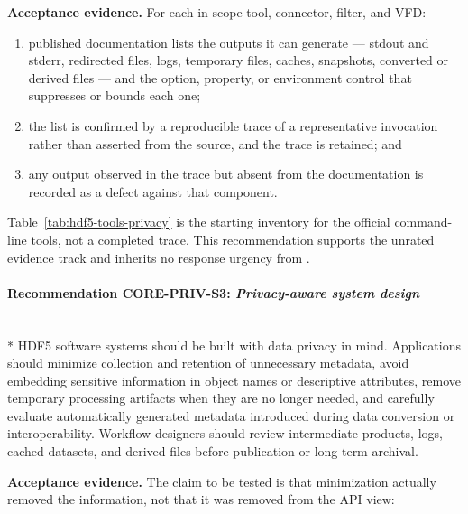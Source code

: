 \documentclass[../main.tex]{subfiles}
\begin{document}
\noindent\textbf{Acceptance evidence.}
For each in-scope tool, connector, filter, and VFD:

\begin{enumerate}[label=(\alph*),leftmargin=2em]
    \item published documentation lists the outputs it can generate --- stdout
          and stderr, redirected files, logs, temporary files, caches,
          snapshots, converted or derived files --- and the option, property,
          or environment control that suppresses or bounds each one;
    \item the list is confirmed by a reproducible trace of a representative
          invocation rather than asserted from the source, and the trace is
          retained; and
    \item any output observed in the trace but absent from the documentation
          is recorded as a defect against that component.
\end{enumerate}

Table~\ref{tab:hdf5-tools-privacy} is the starting inventory for the official
command-line tools, not a completed trace. This recommendation supports the
unrated  evidence track and inherits no response urgency
from .

\paragraph{Recommendation CORE-PRIV-S3: \emph{Privacy-aware system design}}\mbox{}\\*
HDF5 software systems should be built with data privacy in mind. Applications should 
minimize collection and retention of unnecessary metadata, avoid embedding sensitive 
information in object names or descriptive attributes, remove temporary processing
artifacts when they are no longer needed, and carefully evaluate automatically
generated metadata introduced during data conversion or interoperability.
Workflow designers should review intermediate products, logs, cached datasets, and
derived files before publication or long-term archival.

\noindent\textbf{Acceptance evidence.}
The claim to be tested is that minimization actually removed the information,
not that it was removed from the API view:
\end{document}
